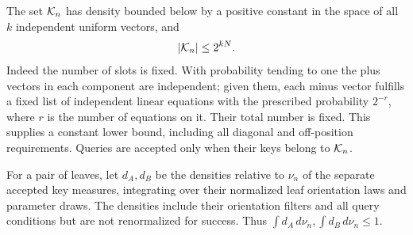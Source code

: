 The set $\mathcal K_n$ has density bounded below by a positive constant
in the space of all $k$ independent uniform vectors, and
\begin{equation}\label{eq:key-space-size}
 |\mathcal K_n|\le 2^{kN}.
\end{equation}
Indeed the number of slots is fixed.  With probability tending
to one the plus vectors in each component are independent;
given them, each minus vector fulfills a fixed list of
independent linear equations with the prescribed probability
$2^{-r}$, where $r$ is the number of equations on it.  Their
total number is fixed.  This supplies a constant lower bound,
including all diagonal and off-position requirements.
Queries are accepted only when their keys belong to $\mathcal K_n$.

For a pair of leaves, let $d_A,d_B$ be the densities relative
to $\nu_n$ of the separate accepted key measures, integrating
over their normalized leaf orientation laws and parameter draws.
The densities include their orientation filters and all query
conditions but are not renormalized for success.  Thus
$\int d_A\,d\nu_n,\int d_B\,d\nu_n\le1$.

